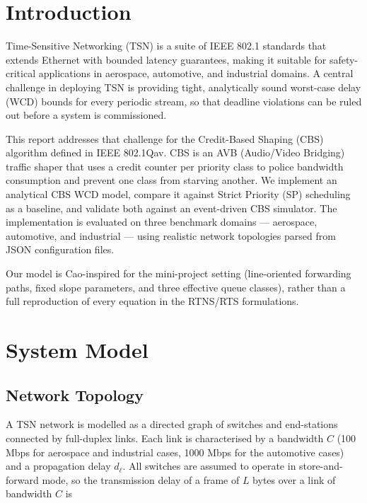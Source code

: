 
\section{Introduction}

Time-Sensitive Networking (TSN) is a suite of IEEE 802.1 standards that extends Ethernet with bounded latency guarantees, making it suitable for safety-critical applications in aerospace, automotive, and industrial domains. A central challenge in deploying TSN is providing tight, analytically sound worst-case delay (WCD) bounds for every periodic stream, so that deadline violations can be ruled out before a system is commissioned.

This report addresses that challenge for the Credit-Based Shaping (CBS) algorithm defined in IEEE 802.1Qav. CBS is an AVB (Audio/Video Bridging) traffic shaper that uses a credit counter per priority class to police bandwidth consumption and prevent one class from starving another. We implement an analytical CBS WCD model, compare it against Strict Priority (SP) scheduling as a baseline, and validate both against an event-driven CBS simulator. The implementation is evaluated on three benchmark domains — aerospace, automotive, and industrial — using realistic network topologies parsed from JSON configuration files.

Our model is Cao-inspired for the mini-project setting (line-oriented forwarding paths, fixed slope parameters, and three effective queue classes), rather than a full reproduction of every equation in the RTNS/RTS formulations.

\section{System Model}
\label{sec:model}

\subsection{Network Topology}

A TSN network is modelled as a directed graph of switches and end-stations connected by full-duplex links. Each link is characterised by a bandwidth $C$ (100 Mbps for aerospace and industrial cases, 1000 Mbps for the automotive cases) and a propagation delay $d_{\ell}$. All switches are assumed to operate in store-and-forward mode, so the transmission delay of a frame of $L$ bytes over a link of bandwidth $C$ is

